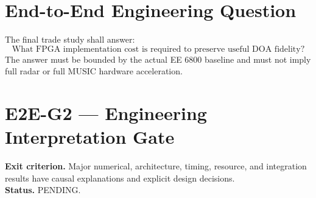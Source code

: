 \section{End-to-End Engineering Question}
The final trade study shall answer:
\begin{equation}
\boxed{\text{What FPGA implementation cost is required to preserve useful DOA fidelity?}}
\end{equation}
The answer must be bounded by the actual EE 6800 baseline and must not imply full radar or
full MUSIC hardware acceleration.

\section{E2E-G2 --- Engineering Interpretation Gate}
\textbf{Exit criterion.} Major numerical, architecture, timing, resource, and integration
results have causal explanations and explicit design decisions.\\
\textbf{Status.} PENDING.

